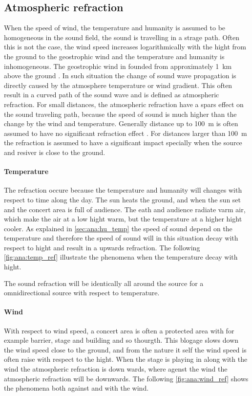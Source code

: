  
\subsection{Atmospheric refraction}
When the speed of wind, the temperature and humanity is assumed to be homogeneous in the sound field, the sound is travelling in a strage path. Often this is not the case, the wind speed increases logarithmically with the hight from the ground to the geostrophic wind \citep{asmos_acous_2016} and the temperature and humanity is inhomogeneous. The geostrophic wind in founded from approximately \SI{1}{\kilo\meter} above the ground \citep{geostrophic_wind}.  In such situation the change of sound wave propagation is directly caused by the atmosphere temperature or wind gradient. This often result in a curved path of the sound wave and is defined as atmospheric refraction. For small distances, the atmospheric refraction have a spars effect on the sound traveling path, because the speed of sound is much higher than the change by the wind and temperature. Generally distance up to \SI{100}{\meter} is often assumed to have no significant refraction effect \citep{effect_of_wind}. For distances larger than \SI{100}{\meter} the refraction is assumed to have a significant impact specially when the source and resiver is close to the ground.  


\paragraph{Temperature} The refraction occure because the temperature and humanity will changes with respect to time along the day.  The sun heats the ground, and when the sun set and the concert area is full of audience. The eath and audience radiate varm air, which make the air at a low hight warm, but the temperature at a higher hight cooler. As explained in \autoref{sec:ana:hu_temp} the speed of sound depend on the temperature and therefore the speed of sound will in this situation decay with respect to hight and result in a upwards refraction. The following \autoref{fig:ana:temp_ref} illustrate the phenomena when the temperature decay with hight.


The sound refraction will be identically all around the source for a omnidirectional source with respect to temperature.


\paragraph{Wind} With respect to wind speed, a concert area is often a protected area with for example barrier, stage and building and so thourgth. This blogage slows down the wind speed close to the ground, and from the nature it self the wind speed is often raise with respect to the hight. When the stage is playing in along with the wind the atmospheric refraction is down wards, where agenst the wind the atmospheric refraction will be downwards. The following \autoref{fig:ana:wind_ref} shows the phenomena both against and with the wind.

